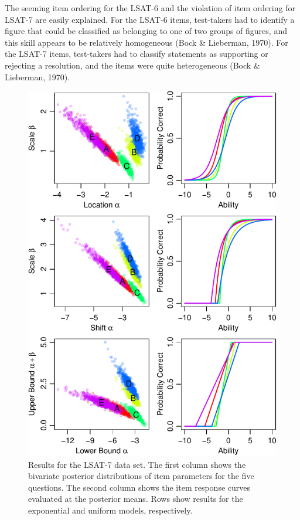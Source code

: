 \documentclass[english,,man]{apa6}
\begin{document}
The seeming item ordering for the LSAT-6 and the violation of item ordering for LSAT-7 are easily explained. For the LSAT-6 items, test-takers had to identify a figure that could be classified as belonging to one of two groups of figures, and this skill appears to be relatively homogeneous (Bock \& Lieberman, 1970). For the LSAT-7 items, test-takers had to classify statements as supporting or rejecting a resolution, and the items were quite heterogeneous (Bock \& Lieberman, 1970).

\begin{figure}
\centering
\includegraphics{p_files/figure-latex/LSAT7-1.pdf}
\caption{\label{fig:LSAT7}Results for the LSAT-7 data set. The first column shows the bivariate posterior distributions of item parameters for the five questions. The second column shows the item response curves evaluated at the posterior means. Rows show results for the exponential and uniform models, respectively.}
\end{figure}
\end{document}
